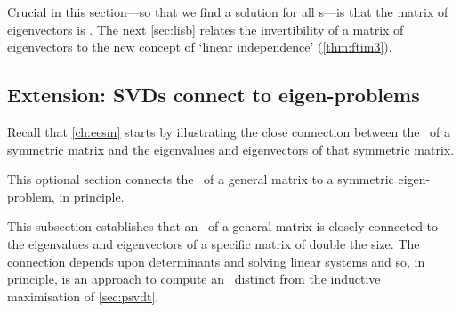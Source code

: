 Crucial in this section---so that we find a solution for all s---is that the matrix of eigenvectors is .
The next \autoref{sec:lisb} relates the invertibility of a matrix of eigenvectors to the new concept of `linear independence' (\autoref{thm:ftim3}).

\subsection{Extension: SVDs connect to eigen-problems}

Recall that \autoref{ch:eesm} starts by illustrating the close connection between the \svd\ of a symmetric matrix and the eigenvalues and eigenvectors of that symmetric matrix.
\begin{aside}
This optional section connects the \svd\ of a general matrix to a symmetric eigen-problem, in principle.
\end{aside}%
This subsection establishes that an \svd\ of a general matrix is closely connected to the eigenvalues and eigenvectors of a specific matrix of double the size.   
The connection depends upon determinants and solving linear systems and so, in principle, is an approach to compute an \svd\ distinct from the inductive maximisation of \autoref{sec:psvdt}.



